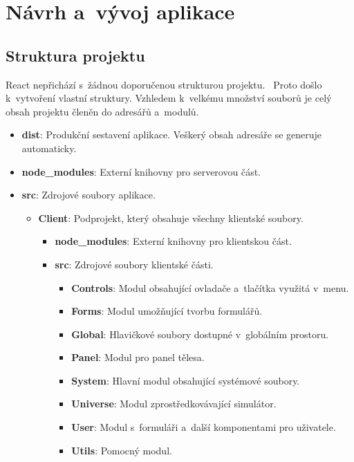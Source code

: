 \documentclass[a4paper,12pt]{article}
\begin{document}
\section{Návrh a~vývoj aplikace}

\subsection{Struktura projektu}

React nepřichází s~žádnou doporučenou strukturou projektu.~\cite{filestructure} Proto došlo k~vytvoření vlastní struktury. Vzhledem k~velkému množství souborů je celý obsah projektu členěn do adresářů a~modulů.

\begin{itemize}
\item \textbf{dist}: Produkční sestavení aplikace. Veškerý obsah adresáře se generuje automaticky.
\item \textbf{node\_modules}: Externí knihovny pro serverovou část.
\item \textbf{src}: Zdrojové soubory aplikace.

\begin{itemize}
\item \textbf{Client}: Podprojekt, který obsahuje všechny klientské soubory.

\begin{itemize}
\item \textbf{node\_modules}: Externí knihovny pro klientskou část.
\item \textbf{src}:  Zdrojové soubory klientské části.

\begin{itemize}
\item \textbf{Controls}: Modul obsahující ovladače a~tlačítka využitá v~menu.
\item \textbf{Forms}: Modul umožňující tvorbu formulářů.
\item \textbf{Global}: Hlavičkové soubory dostupné v~globálním prostoru.
\item \textbf{Panel}: Modul pro panel tělesa.
\item \textbf{System}: Hlavní modul obsahující systémové soubory.
\item \textbf{Universe}: Modul zprostředkovávající simulátor.
\item \textbf{User}: Modul s~formuláři a~další komponentami pro uživatele.
\item \textbf{Utils}: Pomocný modul.
\end{itemize} 


\end{itemize}
\end{itemize}
\end{itemize}
\end{document}

